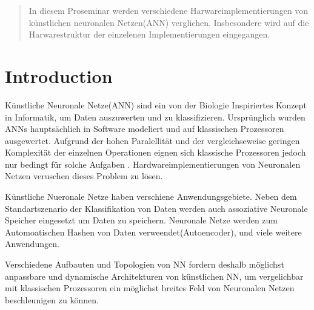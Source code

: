 \documentclass[conference]{IEEEtran}
\begin{document}
    \maketitle

    \begin{abstract}
        In diesem Proseminar werden verschiedene Harwareimplementierungen von künstlichen neuronalen Netzen(ANN) verglichen.
        Insbesondere wird auf die Harwarestruktur der einzelenen Implementierungen eingegangen.

    \end{abstract}





    \IEEEpeerreviewmaketitle



    \section{Introduction}
    Künstliche Neuronale Netze(ANN) sind ein von der Biologie Inspiriertes Konzept in Informatik, um Daten auszuwerten und zu klassifizieren.
    Ursprünglich wurden ANNs hauptsächlich in Software modeliert und auf klassischen Prozessoren ausgewertet. Aufgrund der hohen Paralellität und der vergleichseweise geringen Komplexität der einzelnen Operationen eignen sich klassische Prozessoren jedoch nur bedingt für solche Aufgaben \cite{forssell2014hardware}.
    Hardwareimplementierungen von Neuronalen Netzen veruschen dieses Problem zu lösen.

    Künstliche Nueronale Netze haben verschiene Anwendungsgebiete.
    Neben dem Standartszenario der Klassifikation von Daten werden auch assoziative Neuronale Speicher eingesetzt um Daten zu speichern.
    Neuronale Netze werden zum Automoatischen Hashen von Daten verweendet(Autoencoder), und viele weitere Anwendungen.


    Verschiedene Aufbauten und Topologien von NN fordern deshalb möglichst anpassbare und dynamische Architekturen von künstlichen NN,
    um vergelichbar mit klassischen Prozessoren ein möglichst breites Feld von Neuronalen Netzen beschleunigen zu können.
\end{document}

